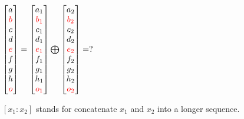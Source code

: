 $
\begin{bmatrix}
  a \\
  \textcolor{red}{b} \\
  c \\
  d \\
  \textcolor{red}{e} \\
  f \\
  g \\
  h \\
  \textcolor{red}{o}
\end{bmatrix} = 
\begin{bmatrix}
  a_1 \\
  \textcolor{red}{b_1} \\
  c_1 \\
  d_1 \\
  \textcolor{red}{e_1} \\
  f_1 \\
  g_1 \\
  h_1 \\
  \textcolor{red}{o_1}
\end{bmatrix} \bigoplus
\begin{bmatrix}
a_2 \\
\textcolor{red}{b_2} \\
c_2 \\
d_2 \\
\textcolor{red}{e_2} \\
f_2 \\
g_2 \\
h_2 \\
\textcolor{red}{o_2}
\end{bmatrix} = ?
$

$[x_1:x_2]$ stands for concatenate $x_1$ and $x_2$ into a longer sequence.


